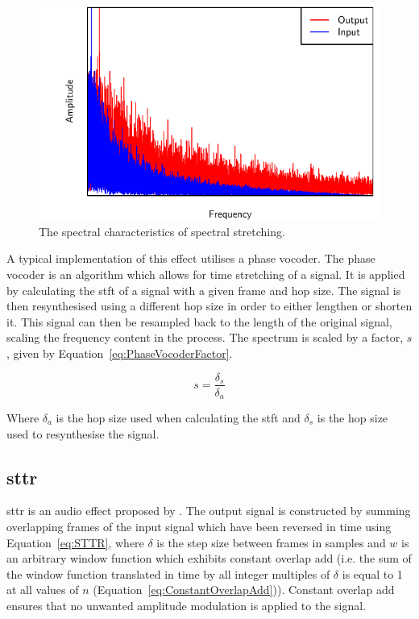		\begin{figure}[h!]
			\centering
			\includegraphics{chapter3/Images/SpectralStretchingSpectrum.pdf}
			\caption{The spectral characteristics of spectral stretching.}
			\label{fig:SpectralStretching}
		\end{figure}

		A typical implementation of this effect utilises a phase vocoder. The phase vocoder is an algorithm which
		allows for time stretching of a signal. It is applied by calculating the \acrfull{stft} of a signal with a
		given frame and hop size. The signal is then resynthesised using a different hop size in order to either
		lengthen or shorten it. This signal can then be resampled back to the length of the original signal,
		scaling the frequency content in the process. The spectrum is scaled by a factor, $s$, given by
		Equation~\ref{eq:PhaseVocoderFactor}.

		\begin{equation}
			s = \frac{\delta_{s}}{\delta_{a}}
			\label{eq:PhaseVocoderFactor}
		\end{equation}

		Where $\delta_{a}$ is the hop size used when calculating the \acrshort{stft} and $\delta_{s}$ is the hop
		size used to resynthesise the signal.

	\subsection{\acrlong{sttr}}
	\label{sec:Excitation-Methods-STTR}
		\acrfull{sttr} is an audio effect proposed by \citet{kim2014shorttime}. The output signal is constructed by
		summing overlapping frames of the input signal which have been reversed in time using
		Equation~\ref{eq:STTR}, where $\delta$ is the step size between frames in samples and $w$ is an arbitrary
		window function which exhibits constant overlap add (i.e. the sum of the window function translated in time
		by all integer multiples of $\delta$ is equal to 1 at all values of $n$
		(Equation~\ref{eq:ConstantOverlapAdd})).  Constant overlap add ensures that no unwanted amplitude
		modulation is applied to the signal.

